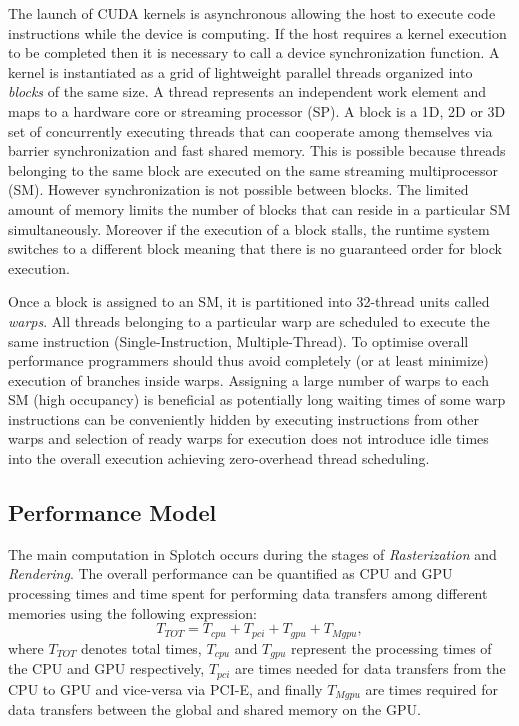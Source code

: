 \documentclass[1p]{elsarticle}
\begin{document}
The launch of CUDA kernels is asynchronous allowing the host to execute code instructions while the device is computing. If the host requires a kernel execution to be completed then it is necessary to call a device synchronization function. A kernel is instantiated as a grid of lightweight parallel threads organized into {\em blocks} of the same size. A thread represents an independent work element and maps to a hardware core or streaming processor (SP). A block is a 1D, 2D or 3D set of concurrently executing threads that can cooperate among themselves via barrier synchronization and fast shared memory. This is possible because threads belonging to the same block are executed on the same streaming multiprocessor (SM). However synchronization is not possible between blocks. The limited amount of memory limits the number of  blocks that can reside in a particular SM simultaneously. Moreover if the execution of a block stalls, the runtime system switches to a different block meaning that there is no guaranteed order for block execution.

Once a block is assigned to an SM, it is partitioned into 32-thread units called {\em warps}. All threads belonging to a particular warp are scheduled to execute the same instruction (Single-Instruction, Multiple-Thread). To optimise overall performance programmers should thus avoid completely (or at least minimize) execution of branches inside warps. Assigning a large number of warps to each SM (high occupancy) is beneficial as potentially long waiting times of some warp instructions can be conveniently hidden by executing instructions from other warps and selection of ready warps for execution does not introduce idle times into the overall execution achieving zero-overhead thread scheduling. 

\subsection{Performance Model}
\label{sec:model}

The main computation in Splotch occurs during the stages of {\it Rasterization} and {\it Rendering}.
The overall performance can be quantified as CPU and GPU processing times 
and time spent for performing data transfers among different memories using the following expression:
\begin{equation}\label{Ts}
T_{TOT} = T_{cpu} + T_{pci} + T_{gpu} + T_{Mgpu},
\end{equation}
where $T_{TOT}$ denotes total times, 
$T_{cpu}$ and $T_{gpu}$ represent the processing times of the CPU and GPU respectively, $T_{pci}$ are times needed for data transfers from the CPU to GPU and vice-versa via PCI-E, and finally $T_{Mgpu}$ are times required for data transfers between the global and shared memory on the GPU. 
\end{document}
